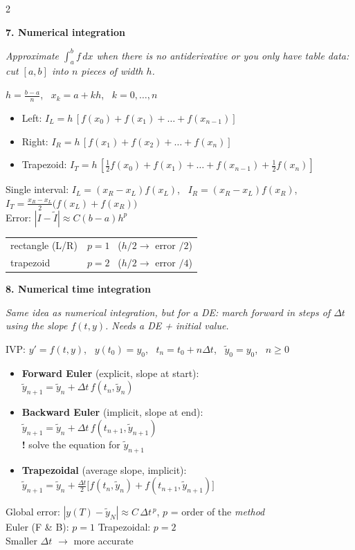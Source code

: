 \documentclass[10pt]{article}
\newcommand{\sect}[2]{%
  \par\vspace{12pt}\noindent                      %
  \colorbox{#1}{\parbox{\dimexpr\columnwidth-2\fboxsep}{\color{white}\bfseries #2}}%
  \par\vspace{4pt}}                               %
\newcommand{\expl}[1]{{\color{gray!80!black}\itshape #1}\par}
\newcommand{\warn}[1]{{\color{BrickRed}\textbf{!} #1}}
\begin{document}
\begin{multicols}{2}
\sect{cNum}{7. Numerical integration}
\expl{Approximate $\int_a^b f\,dx$ when there is no antiderivative or you only have table data: cut $[a,b]$ into $n$ pieces of width $h$.}
$h=\frac{b-a}{n}$, \ $x_k=a+kh$, \ $k=0,\dots,n$
\begin{itemize}
  \item Left: $I_L=h\,[f(x_0)+f(x_1)+\dots+f(x_{n-1})]$
  \item Right: $I_R=h\,[f(x_1)+f(x_2)+\dots+f(x_n)]$
  \item Trapezoid: $I_T=h\,[\tfrac12f(x_0)+f(x_1)+\dots+f(x_{n-1})+\tfrac12f(x_n)]$
\end{itemize}
Single interval: $I_L=(x_R-x_L)f(x_L)$, \ $I_R=(x_R-x_L)f(x_R)$,\\
$I_T=\frac{x_R-x_L}{2}\big(f(x_L)+f(x_R)\big)$\\
Error: $|I-\tilde I|\approx C(b-a)h^p$\\
\begin{tabular}{@{}lc@{}}
rectangle (L/R) & $p=1$ \ ($h/2\rightarrow$ error $/2$)\\
trapezoid & $p=2$ \ ($h/2\rightarrow$ error $/4$)
\end{tabular}

\sect{cNum}{8. Numerical time integration}
\expl{Same idea as numerical integration, but for a DE: march forward in steps of $\Delta t$ using the slope $f(t,y)$. Needs a DE + initial value.}
IVP: $y'=f(t,y)$, \ $y(t_0)=y_0$, \ $t_n=t_0+n\Delta t$, \ $\tilde y_0=y_0$, \ $n\ge0$
\begin{itemize}
  \item \textbf{Forward Euler} (explicit, slope at start):\\
  $\tilde y_{n+1}=\tilde y_n+\Delta t\,f(t_n,\tilde y_n)$
  \item \textbf{Backward Euler} (implicit, slope at end):\\
  $\tilde y_{n+1}=\tilde y_n+\Delta t\,f(t_{n+1},\tilde y_{n+1})$\\
  \warn{solve the equation for $\tilde y_{n+1}$}
  \item \textbf{Trapezoidal} (average slope, implicit):\\
  $\tilde y_{n+1}=\tilde y_n+\frac{\Delta t}{2}\big[f(t_n,\tilde y_n)+f(t_{n+1},\tilde y_{n+1})\big]$
\end{itemize}
Global error: $|y(T)-\tilde y_N|\approx C\,\Delta t^{\,p}$, $p$ = order of the \emph{method}\\
Euler (F \& B): $p=1$ \quad Trapezoidal: $p=2$\\
Smaller $\Delta t$ $\rightarrow$ more accurate

\end{multicols}
\end{document}
